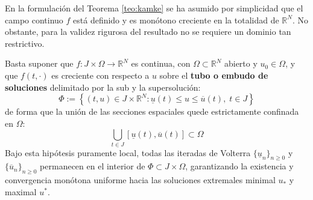 \begin{observación}\label{obs:kamke_dominio_abierto}
    En la formulación del Teorema \ref{teo:kamke} se ha asumido por simplicidad que el campo continuo $f$ está definido y es monótono creciente en la totalidad de $\mathbb{R}^N$. No obstante, para la validez rigurosa del resultado no se requiere un dominio tan restrictivo.
    
    Basta suponer que $f: J \times \Omega \to \mathbb{R}^N$ es continua, con $\Omega \subset \mathbb{R}^N$ abierto y $u_0 \in \Omega$, y que $f(t, \cdot)$ es creciente con respecto a $u$ sobre el \textbf{tubo o embudo de soluciones} delimitado por la sub y la supersolución:
    \[
        \Phi := \left\{ (t, u) \in J \times \mathbb{R}^N : \underline{u}(t) \leq u \leq \overline{u}(t), \; t \in J \right\}
    \]
    de forma que la unión de las secciones espaciales quede estrictamente confinada en $\Omega$:
    \[
        \bigcup_{t \in J} [\underline{u}(t), \overline{u}(t)] \subset \Omega
    \]
    Bajo esta hipótesis puramente local, todas las iteradas de Volterra $\{\underline{u}_n\}_{n \geq 0}$ y $\{\overline{u}_n\}_{n \geq 0}$ permanecen en el interior de $\Phi \subset J \times \Omega$, garantizando la existencia y convergencia monótona uniforme hacia las soluciones extremales minimal $u_*$ y maximal $u^*$.

    \begin{center}
\end{center}
\end{observación}
